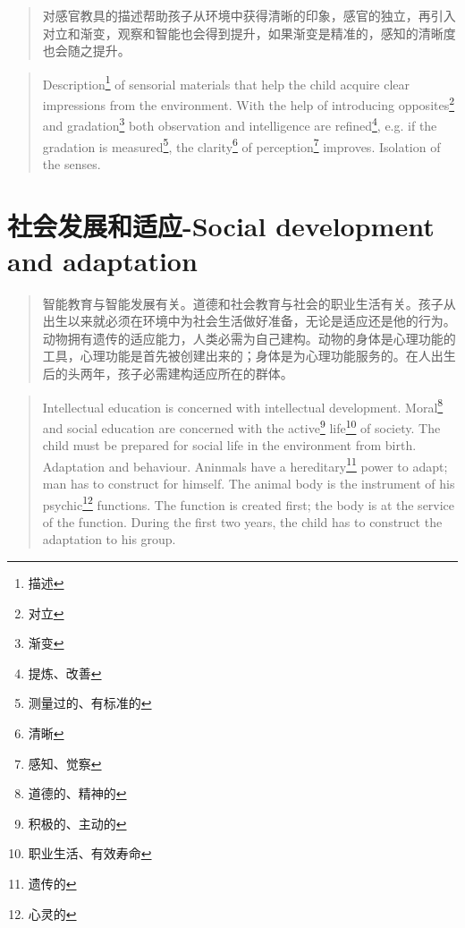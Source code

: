 \documentclass[lang=cn,10pt]{elegantbook}
\begin{document}
\begin{quote}
{\small 对感官教具的描述帮助孩子从环境中获得清晰的印象，感官的独立，再引入对立和渐变，观察和智能也会得到提升，如果渐变是精准的，感知的清晰度也会随之提升。}
\end{quote}

\begin{tcolorbox}
\begin{quote}
{\small Description\footnote{描述} of sensorial materials that help the child acquire clear impressions from the environment. With the help of introducing opposites\footnote{对立} and gradation\footnote{渐变} both observation and intelligence are refined\footnote{提炼、改善}, e.g. if the gradation is measured\footnote{测量过的、有标准的}, the clarity\footnote{清晰} of perception\footnote{感知、觉察} improves. Isolation of the senses.}
\end{quote}
\end{tcolorbox}

\chapter{社会发展和适应-Social development and adaptation}

\begin{quote}
{\small 智能教育与智能发展有关。道德和社会教育与社会的职业生活有关。孩子从出生以来就必须在环境中为社会生活做好准备，无论是适应还是他的行为。动物拥有遗传的适应能力，人类必需为自己建构。动物的身体是心理功能的工具，心理功能是首先被创建出来的；身体是为心理功能服务的。在人出生后的头两年，孩子必需建构适应所在的群体。}
\end{quote}

\begin{tcolorbox}
\begin{quote}
{\small Intellectual education is concerned with intellectual development. Moral\footnote{道德的、精神的} and social education are concerned with the active\footnote{积极的、主动的} life\footnote{职业生活、有效寿命} of society. The child must be prepared for social life in the environment from birth. Adaptation and behaviour. Aninmals have a hereditary\footnote{遗传的} power to adapt; man has to construct for himself. The animal body is the instrument of his psychic\footnote{心灵的} functions. The function is created first; the body is at the service of the function. During the first two years, the child has to construct the adaptation to his group.}
\end{quote}
\end{tcolorbox}
\end{document}

